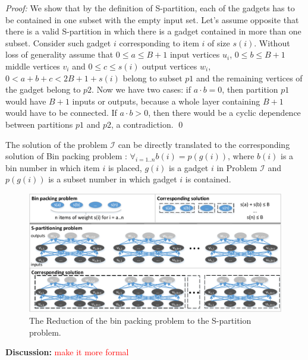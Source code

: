 \documentclass[sigconf]{acmart}
\newcommand\todo[1]{\textcolor{red}{#1}}
\begin{document}
\textit{Proof: }
We show that by the definition of S-partition, each of the gadgets has to 
be contained in one subset with the empty input set. Let's assume 
opposite that there is a valid S-partition in which there is a gadget contained 
in more than one subset. Consider such gadget $i$ corresponding to item $i$ of 
size $s(i)$.
Without loss of generality assume that $0 \le a \le B+1$ input vertices 
$u_{i}$, $0 \le b \le B+1$ middle vertices $v_{i}$ and $0 \le c \le s(i)$ 
output 
vertices $w_{i}$, $0 < a + b + c < 2B + 1 + s(i)$ belong to subset $p1$ and the 
remaining vertices of the gadget belong to $p2$. Now we have two cases: if $a 
\cdot b = 
0$, then partition $p1$ would have $B+1$ inputs or outputs, because a whole 
layer containing $B+1$ would have to be connected. If $a \cdot b > 0$, then 
there would be a cyclic dependence between partitions $p1$ and $p2$, a 
contradiction. \qed

The solution of the problem $\mathcal{I}$ can be directly translated to the 
corresponding solution of Bin packing problem : $\forall_{i = 1..n} b(i) = 
p(g(i))$, where $b(i)$ is a bin number in which item $i$ is placed, $g(i)$ is a 
gadget $i$ in Problem $\mathcal{I}$ and $p(g(i))$ is a subset number in which 
gadget $i$ is contained.

\begin{figure}
	\includegraphics[width=\columnwidth]{figures/spartitioning_nphard3}
	\caption{The Reduction of the bin packing problem to the S-partition 
	problem.}
	\label{fig:spartition_binpacking}
\end{figure}


\textbf{Discussion:} \todo{make it more formal}
\end{document}
